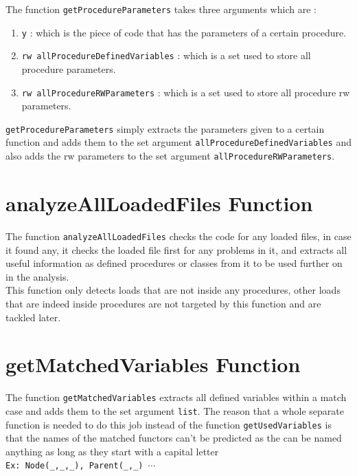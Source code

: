 \documentclass[11pt]{report}
\begin{document}
The function \texttt{getProcedureParameters} takes three arguments which are :
\begin{enumerate}
\item \texttt{y} : which is the piece of code that has the parameters of a certain procedure.

\item \texttt{rw allProcedureDefinedVariables} : which is a set used to store all procedure parameters.

\item \texttt{rw allProcedureRWParameters} : which is a set used to store all procedure rw parameters.

\end{enumerate}

\texttt{getProcedureParameters} simply extracts the parameters given to a certain function and adds them to the set argument \texttt{allProcedureDefinedVariables} and also adds the rw parameters to the set argument \texttt{allProcedureRWParameters}.

\section{analyzeAllLoadedFiles Function}

The function \texttt{analyzeAllLoadedFiles} checks the code for any loaded files, in case it found any, it checks the loaded file first for any problems in it, and extracts all useful information as defined procedures or classes from it to be used further on in the analysis.
\\
This function only detects loads that are not inside any procedures, other loads that are indeed inside procedures are not targeted by this function and are tackled later.

\section{getMatchedVariables Function}

The function \texttt{getMatchedVariables} extracts all defined variables within a match case and adds them to the set argument \texttt{list}. The reason that a whole separate function is needed to do this job instead of the function \texttt{getUsedVariables} is that the names of the matched functors can't be predicted as the can be named anything as long as they start with a capital letter 
\\[0.2cm]
\hspace*{0.6cm}
\texttt{Ex: Node(\_,\_,\_), Parent(\_,\_) $\cdots$}
\\[0.2cm]
\end{document}
